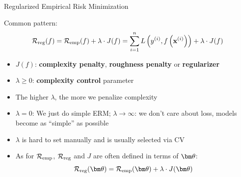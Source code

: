 \documentclass[11pt,compress,t,notes=noshow, xcolor=table]{beamer}
\begin{document}
\begin{vbframe}{Regularized Empirical Risk Minimization}

  
  
  
  


  Common pattern:
  $$
  \mathcal{R}_{\text{reg}}(f) = \mathcal{R}_{\text{emp}}(f) + \lambda \cdot J(f) = \sum\limits_{i=1}^n L\left(y^{(i)}, f\left(\mathbf{x}^{(i)}\right)\right) + \lambda \cdot J(f)
  $$
\begin{itemize}


  \item $J(f)$: \textbf{complexity penalty}, \textbf{roughness penalty} or \textbf{regularizer}
  \item $\lambda \geq 0$: \textbf{complexity control} parameter
  \item The higher $\lambda$, the more we penalize complexity

  \item $\lambda = 0$: We just do simple ERM; $\lambda \to \infty$: we don't care about loss, models become as \enquote{simple} as possible

\item $\lambda$ is hard to set manually and is usually selected via CV

  \item As for $\mathcal{R}_{\text{emp}}$, $\mathcal{R}_{\text{reg}}$ and $J$ are often defined in terms of $\thetav$: \\
  
  $$\riskrt = \risket + \lambda \cdot J(\thetav)$$


\end{itemize}







\end{vbframe}



\endlecture
\end{document}
